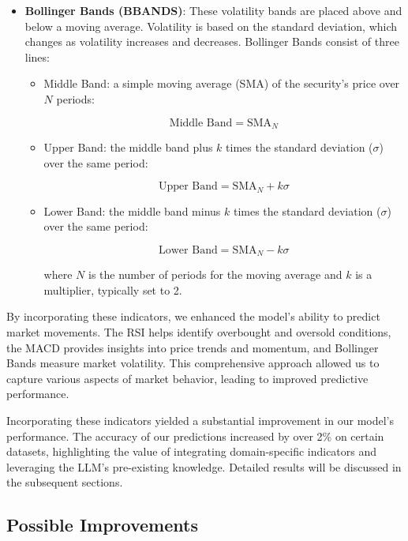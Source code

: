 \begin{itemize}
    \item \textbf{Bollinger Bands (BBANDS)}: These volatility bands are placed above and below a moving average. Volatility is based on the standard deviation, which changes as volatility increases and decreases. Bollinger Bands consist of three lines:

    \begin{itemize}
        \item Middle Band: a simple moving average (SMA) of the security's price over \( N \) periods:

        \[
        \text{Middle Band} = \text{SMA}_{N}
        \]

        \item Upper Band: the middle band plus \( k \) times the standard deviation (\( \sigma \)) over the same period:

        \[
        \text{Upper Band} = \text{SMA}_{N} + k\sigma
        \]

        \item Lower Band: the middle band minus \( k \) times the standard deviation (\( \sigma \)) over the same period:

        \[
        \text{Lower Band} = \text{SMA}_{N} - k\sigma
        \]

        where \( N \) is the number of periods for the moving average and \( k \) is a multiplier, typically set to 2.
    \end{itemize}

\end{itemize}

By incorporating these indicators, we enhanced the model's ability to predict market movements. The RSI helps identify overbought and oversold conditions, the MACD provides insights into price trends and momentum, and Bollinger Bands measure market volatility. This comprehensive approach allowed us to capture various aspects of market behavior, leading to improved predictive performance.

Incorporating these indicators yielded a substantial improvement in our model's performance. The accuracy of our predictions increased by over 2\% on certain datasets, highlighting the value of integrating domain-specific indicators and leveraging the LLM's pre-existing knowledge. Detailed results will be discussed in the subsequent sections.

\subsection{Possible Improvements}

